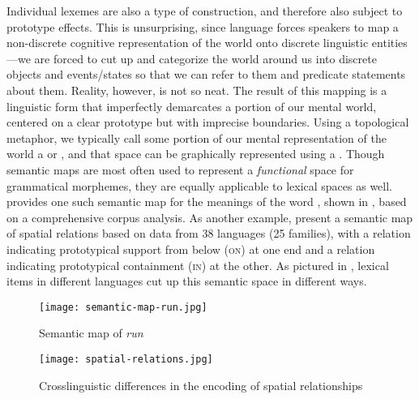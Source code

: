 Individual lexemes are also a type of construction, and therefore also subject to prototype effects. This is unsurprising, since language forces speakers to map a non-discrete cognitive representation of the world onto discrete linguistic entities—we are forced to cut up and categorize the world around us into discrete objects and events/states so that we can refer to them and predicate statements about them. Reality, however, is not so neat. The result of this mapping is a linguistic form that imperfectly demarcates a portion of our mental world, centered on a clear prototype but with imprecise boundaries. Using a topological metaphor, we typically call some portion of our mental representation of the world a  or  \parencite[92]{Croft2001b}, and that space can be graphically represented using a  \parencites[§2.4.3]{Croft2001b}{Haspelmath2003}. Though semantic maps are most often used to represent a \emph{functional} space for grammatical morphemes, they are equally applicable to lexical spaces as well. \textcite[74]{Gries2006} provides one such semantic map for the meanings of the  word , shown in , based on a comprehensive corpus analysis. As another example, \textcite[485]{BowermanChoi2001} present a semantic map of spatial relations based on data from 38 languages (25 families), with a relation indicating prototypical support from below (\textsc{on}) at one end and a relation indicating prototypical containment (\textsc{in}) at the other. As pictured in , lexical items in different languages cut up this semantic space in different ways.

\clearpage
  \begin{figure}[h!]
    \texttt{[image: semantic-map-run.jpg]}
    \caption[Semantic map of English \textit{run}]{Semantic map of  \textit{run} \parencite[74]{Gries2006}}
    \label{fig:semantic-map-run}
  \end{figure}
\clearpage

\begin{figure}[h!]
  \texttt{[image: spatial-relations.jpg]}
  \caption[Crosslinguistic differences in the encoding of spatial relationships]{Crosslinguistic differences in the encoding of spatial relationships \parencite[485]{BowermanChoi2001}}
  \label{fig:spatial-relations}
\end{figure}

